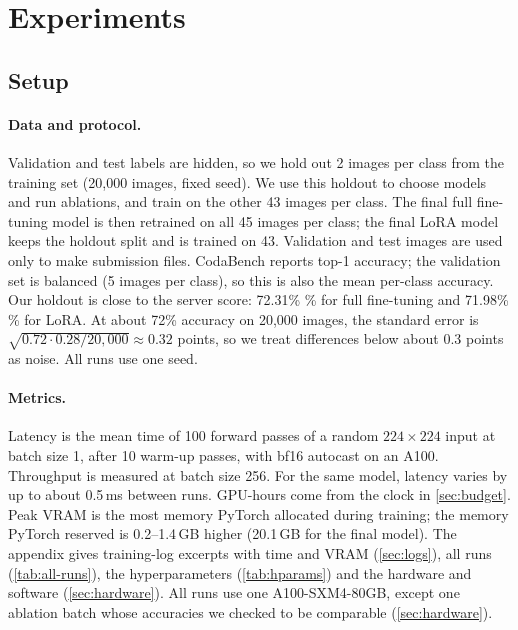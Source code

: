 \section{Experiments}
\label{sec:experiments}

\subsection{Setup}
\label{sec:setup}

\paragraph{Data and protocol.}
Validation and test labels are hidden, so we hold out 2 images per class from the training set (20,000 images, fixed seed).
We use this holdout to choose models and run ablations, and train on the other 43 images per class.
The final full fine-tuning model is then retrained on all 45 images per class; the final LoRA model keeps the holdout split and is trained on 43.
Validation and test images are used only to make submission files.
CodaBench reports top-1 accuracy; the validation set is balanced (5 images per class), so this is also the mean per-class accuracy.
Our holdout is close to the server score: 72.31\% \% for full fine-tuning and 71.98\% \% for LoRA.
At about 72\% accuracy on 20,000 images, the standard error is $\sqrt{0.72 \cdot 0.28 / 20{,}000} \approx 0.32$ points, so we treat differences below about 0.3 points as noise.
All runs use one seed.

\paragraph{Metrics.}
Latency is the mean time of 100 forward passes of a random $224 \times 224$ input at batch size 1, after 10 warm-up passes, with bf16 autocast on an A100.
Throughput is measured at batch size 256.
For the same model, latency varies by up to about 0.5\,ms between runs.
GPU-hours come from the clock in \cref{sec:budget}.
Peak VRAM is the most memory PyTorch allocated during training; the memory PyTorch reserved is 0.2--1.4\,GB higher (20.1\,GB for the final model).
The appendix gives training-log excerpts with time and VRAM (\cref{sec:logs}), all runs (\cref{tab:all-runs}), the hyperparameters (\cref{tab:hparams}) and the hardware and software (\cref{sec:hardware}).
All runs use one A100-SXM4-80GB, except one ablation batch whose accuracies we checked to be comparable (\cref{sec:hardware}).

